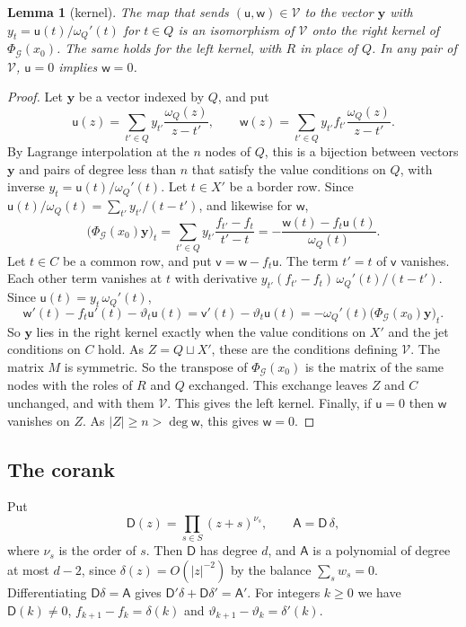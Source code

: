 \documentclass[11pt]{amsart}
\newtheorem{lemma}[theorem]{Lemma}
\theoremstyle{definition}
\theoremstyle{remark}
\numberwithin{equation}{section}
\begin{document}
\begin{lemma}[kernel]\label{lem:kernelpairs}
The map that sends $(\mathsf u,\mathsf w)\in\mathcal V$ to the vector $\mathbf y$ with
$y_t=\mathsf u(t)/\omega_Q'(t)$ for $t\in Q$ is an isomorphism of $\mathcal V$ onto the right kernel of
$\Phi_{\mathcal G}(x_0)$. The same holds for the left kernel, with $R$ in place of $Q$. In any pair of $\mathcal V$,
$\mathsf u=0$ implies $\mathsf w=0$.
\end{lemma}
\begin{proof}
Let $\mathbf y$ be a vector indexed by $Q$, and put
\[
 \mathsf u(z)=\sum_{t'\in Q}y_{t'}\frac{\omega_Q(z)}{z-t'},\qquad
 \mathsf w(z)=\sum_{t'\in Q}y_{t'}f_{t'}\frac{\omega_Q(z)}{z-t'} .
\]
By Lagrange interpolation at the $n$ nodes of $Q$, this is a bijection between vectors $\mathbf y$ and pairs of
degree less than $n$ that satisfy the value conditions on $Q$, with inverse $y_t=\mathsf u(t)/\omega_Q'(t)$. Let
$t\in X'$ be a border row. Since $\mathsf u(t)/\omega_Q(t)=\sum_{t'}y_{t'}/(t-t')$, and likewise for $\mathsf w$,
\[
 \bigl(\Phi_{\mathcal G}(x_0)\mathbf y\bigr)_t=\sum_{t'\in Q}y_{t'}\frac{f_{t'}-f_t}{t'-t}
 =-\frac{\mathsf w(t)-f_t\mathsf u(t)}{\omega_Q(t)} .
\]
Let $t\in C$ be a common row, and put $\mathsf v=\mathsf w-f_t\mathsf u$. The term $t'=t$ of $\mathsf v$ vanishes. Each
other term vanishes at $t$ with derivative $y_{t'}(f_{t'}-f_t)\,\omega_Q'(t)/(t-t')$. Since
$\mathsf u(t)=y_t\,\omega_Q'(t)$,
\[
 \mathsf w'(t)-f_t\mathsf u'(t)-\vartheta_t\mathsf u(t)=\mathsf v'(t)-\vartheta_t\mathsf u(t)
 =-\omega_Q'(t)\bigl(\Phi_{\mathcal G}(x_0)\mathbf y\bigr)_t .
\]
So $\mathbf y$ lies in the right kernel exactly when the value conditions on $X'$ and the jet conditions on $C$ hold.
As $Z=Q\sqcup X'$, these are the conditions defining $\mathcal V$. The matrix $M$ is symmetric. So the transpose of
$\Phi_{\mathcal G}(x_0)$ is the matrix of the same nodes with the roles of $R$ and $Q$ exchanged. This exchange leaves
$Z$ and $C$ unchanged, and with them $\mathcal V$. This gives the left kernel. Finally, if $\mathsf u=0$ then
$\mathsf w$ vanishes on $Z$. As $|Z|\ge n>\deg\mathsf w$, this gives $\mathsf w=0$.
\end{proof}

\subsection{The corank}
Put
\[
 \mathsf D(z)=\prod_{s\in S}(z+s)^{\nu_s},\qquad \mathsf A=\mathsf D\,\delta ,
\]
where $\nu_s$ is the order of $s$. Then $\mathsf D$ has degree $d$, and $\mathsf A$ is a polynomial of degree at most
$d-2$, since $\delta(z)=O(|z|^{-2})$ by the balance $\sum_sw_s=0$. Differentiating $\mathsf D\delta=\mathsf A$ gives
$\mathsf D'\delta+\mathsf D\delta'=\mathsf A'$. For integers $k\ge0$ we have $\mathsf D(k)\ne0$, $f_{k+1}-f_k=\delta(k)$
and $\vartheta_{k+1}-\vartheta_k=\delta'(k)$.
\end{document}
